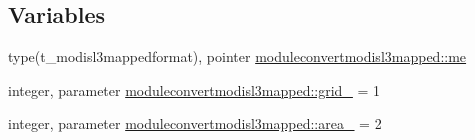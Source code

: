 \subsection*{Variables}
\begin{DoxyCompactItemize}
\item 
type(t\+\_\+modisl3mappedformat), pointer \mbox{\hyperlink{namespacemoduleconvertmodisl3mapped_a1a142d4981ab45ab3eace9a2dd1fe02b}{moduleconvertmodisl3mapped\+::me}}
\item 
integer, parameter \mbox{\hyperlink{namespacemoduleconvertmodisl3mapped_a790db33a2adf6b082ff7a6e70161046a}{moduleconvertmodisl3mapped\+::grid\+\_\+}} = 1
\item 
integer, parameter \mbox{\hyperlink{namespacemoduleconvertmodisl3mapped_a5c80d28c4928b02232f725e7ad1b4c94}{moduleconvertmodisl3mapped\+::area\+\_\+}} = 2
\end{DoxyCompactItemize}
